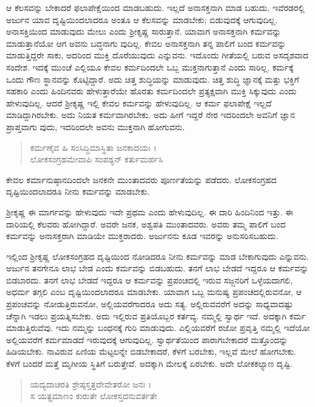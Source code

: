 ಆ ಕೆಲಸವನ್ನು ಬೇಕಾದರೆ ಫಲಾಪೇಕ್ಷೆಯಿಂದ ಮಾಡಬಹುದು. ಇಲ್ಲದೆ ಅನಾಸಕ್ತನಾಗಿ ಮಾಡ ಬಹುದು. ಇವೆರಡರಲ್ಲಿ ಅರ್ಜುನ ಯಾವ ದೃಷ್ಟಿಯಿಂದಲಾದರೂ ಅಂತೂ ಆ ಕೆಲಸವನ್ನು ಮಾಡಬೇಕು; ಬಿಡುವುದಕ್ಕೆ ಆಗುವುದಿಲ್ಲ. ಅನಾಸಕ್ತಿಯಿಂದ ಮಾಡುವುದು ಮೇಲು ಎಂದು ಶ್ರೀಕೃಷ್ಣ ಸಾರುತ್ತಾನೆ. ಯಾವಾಗ ಅನಾಸಕ್ತನಾಗಿ ಕರ್ಮವನ್ನು ಮಾಡುತ್ತಾನೆಯೋ ಆಗ ಅವನು ಬದ್ಧನಾಗು ವುದಿಲ್ಲ. ಕೇವಲ ಅನಾಸಕ್ತನಾಗಿ ತನ್ನ ಪಾಲಿಗೆ ಬಂದ ಕರ್ಮವನ್ನು ಮಾಡುತ್ತಿದ್ದರೇ ಸಾಕು, ಅದರಿಂದ ಮುಕ್ತಿ ದೊರೆಯುವುದು ಎನ್ನುವನು. ಇದೊಂದು ಗೀತೆಯಲ್ಲಿ ಬರುವ ಅಸದೃಶವಾದ ಸಂದೇಶ. ಇದಕ್ಕೆ ಮುಂಚೆ ಎಲ್ಲಿಯೂ ಕೇವಲ ಕರ್ಮದಿಂದಲೇ ಒಬ್ಬ ಮುಕ್ತನಾಗುತ್ತಾನೆ ಎಂದು ಸಾರಿಲ್ಲ. ಕರ್ಮಕ್ಕೆ ಒಂದು ಗೌಣ ಸ್ಥಾನವನ್ನು ಕೊಟ್ಟಿದ್ದಾರೆ. ಅದು ಚಿತ್ತ ಶುದ್ಧಿಯನ್ನು ಮಾಡುವುದು. ಚಿತ್ತ ಶುದ್ಧಿ ಜ್ಞಾನಕ್ಕೆ ಮತ್ತು ಭಕ್ತಿಗೆ ಸಹಕಾರಿ ಎಂದು ಹಿಂದಿನವರು ಹೇಳುತ್ತಾರೆಯೇ ಹೊರತು ಕರ್ಮದಿಂದಲೇ ಪ್ರತ್ಯಕ್ಷವಾಗಿ ಮುಕ್ತಿ ಸಿಕ್ಕುವುದು ಎಂದು ಹೇಳುವುದಿಲ್ಲ. ಆದರೆ ಶ್ರೀಕೃಷ್ಣ ಇಲ್ಲಿ ಕೇವಲ ಕರ್ಮವನ್ನು ಹೇಳುವುದಿಲ್ಲ. ಆ ಕರ್ಮ ಫಲಾಪೇಕ್ಷೆ ಇಲ್ಲದೆ ಮಾಡಿದ್ದಾಗಿರಬೇಕು. ಅದು ನಿಯತ ಕರ್ಮವಾಗಿರಬೇಕು. ಅದು ಹೀಗೆ ಇದ್ದರೆ ನೇರ ಇದರಿಂದಲೇ ಅವನಿಗೆ ಜ್ಞಾನ ಪ್ರಾಪ್ತವಾಗು ವುದು, ಇದರಿಂದಲೇ ಅವನು ಮುಕ್ತನಾಗಿ ಹೋಗುವನು.

\begin{verse}
ಕರ್ಮಣೈವ ಹಿ ಸಂಸಿದ್ಧಿಮಾಸ್ಥಿತಾ ಜನಕಾದಯಃ ।\\ಲೋಕಸಂಗ್ರಹಮೇವಾಪಿ ಸಂಪಶ್ಯನ್ ಕರ್ತುಮರ್ಹಸಿ 
\end{verse}

{\small ಕೇವಲ ಕರ್ಮಾನುಷ್ಠಾನದಿಂದಲೇ ಜನಕನೇ ಮುಂತಾದವರು ಪೂರ್ಣತೆಯನ್ನು ಪಡೆದರು. ಲೋಕಸಂಗ್ರಹದ ದೃಷ್ಟಿಯಿಂದಲಾದರೂ ನೀನು ಕರ್ಮವನ್ನು ಮಾಡಬೇಕು.}

ಶ್ರೀಕೃಷ್ಣ ಈ ಮಾರ್ಗವನ್ನು ಹೇಳುವುದು ಇದೇ ಪ್ರಥಮ ಎಂದು ಹೇಳುವುದಿಲ್ಲ. ಈ ದಾರಿ ಹಿಂದಿನಿಂದ ಇತ್ತು. ಈ ದಾರಿಯಲ್ಲಿ ಕೆಲವರು ಹೋಗಿದ್ದಾರೆ. ಅವರೇ ಜನಕ, ಅಶ್ವಪತಿ ಮುಂತಾದವರು. ಅವರು ತಮ್ಮ ಪಾಲಿಗೆ ಬಂದ ಕರ್ಮವನ್ನು ಅನಾಸಕ್ತರಾಗಿ ಮಾಡಿಯೇ ಮುಕ್ತರಾದರು. ಅರ್ಜುನನು ಕೂಡ ಇವರನ್ನು ಅನುಸರಿಸಬಹುದು.

ಇಲ್ಲಿಂದ ಶ್ರೀಕೃಷ್ಣ ಲೋಕಸಂಗ್ರಹದ ದೃಷ್ಟಿಯಿಂದ ನೋಡಿದರೂ ನೀನು ಕರ್ಮವನ್ನು ಮಾಡ ಬೇಕಾಗುವುದು ಎನ್ನುವನು. ಅರ್ಜುನ ತನಗೇನೂ ಲಾಭ ಬೇಡ ಎಂದು ಕರ್ಮವನ್ನು ಬಿಡಬಹುದು. ತನಗೆ ಲಾಭ ಬೇಡದೆ ಇದ್ದರೂ ಆ ಕರ್ಮವನ್ನು ಬಿಡಬಾರದು. ತನಗೆ ಲಾಭ ಬೇಡದೆ ಇದ್ದರೂ ಆ ಕರ್ಮವನ್ನು ಪ್ರಪಂಚದಲ್ಲಿ ಇರುವ ಸಜ್ಜನರಿಗೆ ಒಳ್ಳೆಯದಾಗಲಿ, ಅಧರ್ಮ ತಗ್ಗಲಿ ಎಂಬ ದೃಷ್ಟಿಯಿಂದಲಾದರೂ ಮಾಡಬೇಕು. ಯಾವಾಗ ಒಬ್ಬ ಮನುಷ್ಯ ಪ್ರಪಂಚದಲ್ಲಿರುವನೋ, ಆ ಪ್ರಪಂಚವನ್ನು ನೋಡುತ್ತಿರುವನೋ, ಅಲ್ಲಿಯವರೆಗಾದರೂ ಅದು ಸತ್ಯ. ಅಲ್ಲಿರುವವರೆಗೆ ಅದನ್ನು ಸಾಧ್ಯವಾದಷ್ಟು ಚೆನ್ನಾಗಿ ಇಡಲು ಪ್ರಯತ್ನಿಸಬೇಕು. ಅದು ಇಲ್ಲಿರುವ ಪ್ರತಿಯೊಬ್ಬರ ಕರ್ತವ್ಯ. ನಮ್ಮಲ್ಲಿ ಸ್ವಾರ್ಥ ಇದೆ. ಅದಕ್ಕಾಗಿ ಕರ್ಮ ಮಾಡುತ್ತಿರುವೆವು. ಇದು ನಮ್ಮನ್ನು ಬಂಧನಕ್ಕೆ ಗುರಿ ಮಾಡುವುದು. ಎಲ್ಲಿಯವರೆಗೆ ರಜೋ ಪ್ರವೃತ್ತಿ ನಮ್ಮಲ್ಲಿ ಇದೆಯೋ ಅಲ್ಲಿಯವರೆಗೆ ಕರ್ಮಮಾಡದೆ ಇರುವುದಕ್ಕೆ ಆಗುವುದಿಲ್ಲ. ಸ್ವಾರ್ಥತೆಯಿಂದ ಪಾರಾಗಬೇಕಾದರೆ ಮತ್ತೊಂದನ್ನು ಹಿಡಿಯಬೇಕು. ನಾವಿರುವ ಏಣಿಯ ಮೆಟ್ಟಲನ್ನೇ ಬಿಡಬೇಕಾದರೆ, ಕೆಳಗೆ ಬರಬೇಕು, ಇಲ್ಲವೆ ಮೇಲೆ ಹೋಗಬೇಕು. ಕೆಳಗೆ ಬಂದರೆ ಮತ್ತೆ ಮೃಗೀಯ ಸ್ಥಿತಿಗೆ ಬರುತ್ತೇವೆ. ಅದಕ್ಕಾಗಿ ಮೇಲಕ್ಕೆ ಏರಬೇಕು. ಅದೇ ಲೋಕಕಲ್ಯಾಣ ದೃಷ್ಟಿ.

\begin{verse}
ಯದ್ಯದಾಚರತಿ ಶ್ರೇಷ್ಠಸ್ತತ್ತದೇವೇತರೋ ಜನಃ ।\\ಸ ಯತ್ಪ್ರಮಾಣಂ ಕುರುತೇ ಲೋಕಸ್ತದನುವರ್ತತೇ 
\end{verse}

